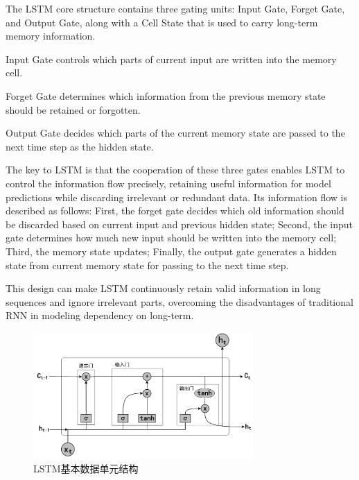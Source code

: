 The LSTM core structure contains three gating units: Input Gate, Forget Gate, and Output Gate, along with a Cell State that is used to carry long-term memory information.

Input Gate controls which parts of current input are written into the memory cell.

Forget Gate determines which information from the previous memory state should be retained or forgotten.

Output Gate decides which parts of the current memory state are passed to the next time step as the hidden state.

The key to LSTM is that the cooperation of these three gates enables LSTM to control the information flow precisely, retaining useful information for model predictions while discarding irrelevant or redundant data. Its information flow is described as follows: First, the forget gate decides which old information should be discarded based on current input and previous hidden state; Second, the input gate determines how much new input should be written into the memory cell; Third, the memory state updates; Finally, the output gate generates a hidden state from current memory state for passing to the next time step.

This design can make LSTM continuously retain valid information in long sequences and ignore irrelevant parts, overcoming the disadvantages of traditional RNN in modeling dependency on long-term.


\begin{figure}[hbt]
	\centering
	\includegraphics[width=0.75\textwidth]{figures/2.5}
	\caption{LSTM基本数据单元结构}\label{fig:2.5}
\end{figure}

